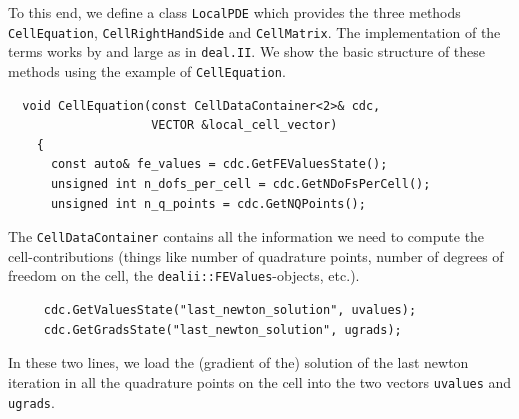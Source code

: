 \documentclass[prodmode,acmtoms]{acmsmall}
\numberwithin{equation}{section}
\newcommand{\deal}{\texttt{deal.II}}
\begin{document}
To this end, we define a class \texttt{LocalPDE} which provides the three methods
\texttt{CellEquation}, \texttt{CellRightHandSide} and \texttt{CellMatrix}. The implementation of the terms works by and large as in \deal{}. We show the basic structure of these methods using the example of \texttt{CellEquation}.

\begin{lstlisting}
  void CellEquation(const CellDataContainer<2>& cdc,
                    VECTOR &local_cell_vector)
    {
      const auto& fe_values = cdc.GetFEValuesState();
      unsigned int n_dofs_per_cell = cdc.GetNDoFsPerCell();
      unsigned int n_q_points = cdc.GetNQPoints();
\end{lstlisting}
 The \texttt{CellDataContainer} contains all the information we need to compute the cell-contributions (things like number of quadrature points, number of degrees of freedom on the cell, the \texttt{dealii::FEValues}-objects, etc.).
  \begin{lstlisting}
     cdc.GetValuesState("last_newton_solution", uvalues);
     cdc.GetGradsState("last_newton_solution", ugrads);
 \end{lstlisting}
 In these two lines, we load the (gradient of the) solution of the last newton iteration in all the quadrature points on the cell into the two vectors \texttt{uvalues} and \texttt{ugrads}.
\end{document}
